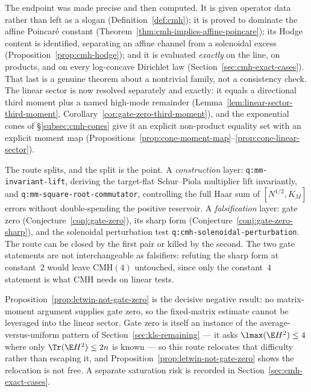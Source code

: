 \documentclass[../../main.tex]{subfiles}
\begin{document}
\begin{description}[leftmargin=0pt,style=nextline,itemsep=0.3em]
  \item[4. Main advance so far.] The endpoint was made precise and then computed. It is given
  operator data rather than left as a slogan (Definition~\ref{def:cmh}); it is proved to
  dominate the affine Poincar\'e constant (Theorem~\ref{thm:cmh-implies-affine-poincare}); its
  Hodge content is identified, separating an affine channel from a solenoidal excess
  (Proposition~\ref{prop:cmh-hodge}); and it is evaluated \emph{exactly} on the line, on
  products, and on every log-concave Dirichlet law (Section~\ref{sec:cmh-exact-cases}). That
  last is a genuine theorem about a nontrivial family, not a consistency check. The linear
  sector is now resolved separately and exactly: it equals a directional third moment plus a
  named high-mode remainder (Lemma~\ref{lem:linear-sector-third-moment},
  Corollary~\ref{cor:gate-zero-third-moment}), and the exponential cones of
  \S\ref{subsec:cmh-cones} give it an explicit non-product equality set with an explicit moment
  map (Propositions~\ref{prop:cone-moment-map}--\ref{prop:cone-linear-sector}).

  \item[5. Exact bottleneck.] The route splits, and the split is the point. A
  \emph{construction} layer: \texttt{q:mm-invariant-lift}, deriving the target-flat
  Schur--Piola multiplier lift invariantly, and \texttt{q:mm-square-root-commutator},
  controlling the full Haar sum of $[N^{1/2},K_M]$ errors without double-spending the positive
  reservoir. A \emph{falsification} layer: gate zero (Conjecture~\ref{conj:gate-zero}), its
  sharp form (Conjecture~\ref{conj:gate-zero-sharp}), and the solenoidal perturbation test
  \texttt{q:cmh-solenoidal-perturbation}. The route can be closed by the first pair or killed
  by the second. The two gate statements are not interchangeable as falsifiers: refuting the
  sharp form at constant~$2$ would leave $\mathrm{CMH}(4)$ untouched, since only the
  constant~$4$ statement is what CMH needs on linear tests.

  \item[6. Failed variants and obstructions.] Proposition~\ref{prop:letwin-not-gate-zero} is
  the decisive negative result: no matrix-moment argument supplies gate zero, so the
  fixed-matrix estimate cannot be leveraged into the linear sector. Gate zero is itself an
  instance of the average-versus-uniform pattern of Section~\ref{sec:kls-remaining} --- it asks
  $\lmax(\E H^2)\le4$ where only $\Tr(\E H^2)\le2n$ is known --- so this route relocates that
  difficulty rather than escaping it, and Proposition~\ref{prop:letwin-not-gate-zero} shows the
  relocation is not free. A separate saturation risk is recorded in
  Section~\ref{sec:cmh-exact-cases}.


\end{description}
\end{document}
